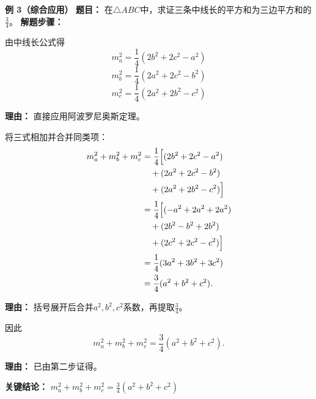 \begin{examplebox}
	\medskip
	\textbf{\textcolor{CExample}{例 3（综合应用）}}
	\textbf{\textcolor{CExample}{题目：}}
	在$\triangle ABC$中，求证三条中线长的平方和为三边平方和的$\frac34$。
	\textbf{\textcolor{CExample}{解题步骤：}}
	\begin{description}[style=nextline, leftmargin=2.8em, labelsep=0.5em, itemsep=0.45em]
		\item[\textbf{第一步（写出中线公式）：}]
			由中线长公式得
			\[
				m_a^2 = \frac14(2b^2+2c^2-a^2)
			\]
			\[
				m_b^2 = \frac14(2a^2+2c^2-b^2)
			\]
			\[
				m_c^2 = \frac14(2a^2+2b^2-c^2)
			\]
			\par\textbf{理由：} 直接应用阿波罗尼奥斯定理。
		\item[\textbf{第二步（求和化简）：}]
			将三式相加并合并同类项：
			\[
				\begin{aligned}
					m_a^2+m_b^2+m_c^2 &= \frac14\Bigl[ (2b^2+2c^2-a^2) \\ &\quad + (2a^2+2c^2-b^2) \\ &\quad + (2a^2+2b^2-c^2) \Bigr] \\ &= \frac14\Bigl[(-a^2+2a^2+2a^2) \\ &\quad + (2b^2-b^2+2b^2) \\ &\quad + (2c^2+2c^2-c^2)\Bigr] \\ &= \frac14(3a^2+3b^2+3c^2) \\ &= \frac34(a^2+b^2+c^2).
			\end{aligned}
			\]
			\par\textbf{理由：} 括号展开后合并$a^2,b^2,c^2$系数，再提取$\frac34$。
		\item[\textbf{第三步（得出结论）：}]
			因此
			\[
				m_a^2+m_b^2+m_c^2 = \frac34(a^2+b^2+c^2).
			\]
			\par\textbf{理由：} 已由第二步证得。
	\end{description}
	\textbf{\textcolor{CExample}{关键结论：}}
	\textbf{$m_a^2+m_b^2+m_c^2 = \frac34(a^2+b^2+c^2)$}
\end{examplebox}
